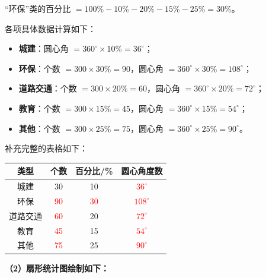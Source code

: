 “环保”类的百分比 $= 100\% - 10\% - 20\% - 15\% - 25\% = 30\%$。

各项具体数据计算如下：
\begin{itemize}
    \item \textbf{城建}：圆心角 $= 360^\circ \times 10\% = 36^\circ$；
    \item \textbf{环保}：个数 $= 300 \times 30\% = 90$，圆心角 $= 360^\circ \times 30\% = 108^\circ$；
    \item \textbf{道路交通}：个数 $= 300 \times 20\% = 60$，圆心角 $= 360^\circ \times 20\% = 72^\circ$；
    \item \textbf{教育}：个数 $= 300 \times 15\% = 45$，圆心角 $= 360^\circ \times 15\% = 54^\circ$；
    \item \textbf{其他}：个数 $= 300 \times 25\% = 75$，圆心角 $= 360^\circ \times 25\% = 90^\circ$。
\end{itemize}

补充完整的表格如下：

\begin{center}
\renewcommand{\arraystretch}{1.5}
\begin{tabular}{|c|c|c|c|}
\hline
\rowcolor{gray!25}
类型 & 个数 & 百分比/\% & 圆心角度数 \\
\hline
城建 & 30 & 10 & \textcolor{red}{$36^\circ$} \\
\hline
环保 & \textcolor{red}{90} & \textcolor{red}{30} & \textcolor{red}{$108^\circ$} \\
\hline
道路交通 & \textcolor{red}{60} & 20 & \textcolor{red}{$72^\circ$} \\
\hline
教育 & \textcolor{red}{45} & 15 & \textcolor{red}{$54^\circ$} \\
\hline
其他 & \textcolor{red}{75} & 25 & \textcolor{red}{$90^\circ$} \\
\hline
\end{tabular}
\end{center}

\vspace{0.4cm}
\textbf{（2）扇形统计图绘制如下：}

